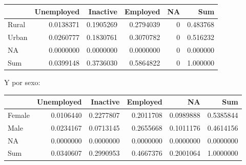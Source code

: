\documentclass[
  spanish,
  12pt,
]{book}
\newenvironment{Shaded}{\begin{snugshade}}{\end{snugshade}}
\newcommand{\AttributeTok}[1]{\textcolor[rgb]{0.13,0.29,0.53}{#1}}
\newcommand{\FunctionTok}[1]{\textcolor[rgb]{0.13,0.29,0.53}{\textbf{#1}}}
\newcommand{\NormalTok}[1]{#1}
\newcommand{\SpecialCharTok}[1]{\textcolor[rgb]{0.81,0.36,0.00}{\textbf{#1}}}
\newcommand{\StringTok}[1]{\textcolor[rgb]{0.31,0.60,0.02}{#1}}
\begin{document}
\begin{tabular}{l|r|r|r|r|r}
\hline
  & Unemployed & Inactive & Employed & NA & Sum\\
\hline
Rural & 0.0138371 & 0.1905269 & 0.2794039 & 0 & 0.483768\\
\hline
Urban & 0.0260777 & 0.1830761 & 0.3070782 & 0 & 0.516232\\
\hline
NA & 0.0000000 & 0.0000000 & 0.0000000 & 0 & 0.000000\\
\hline
Sum & 0.0399148 & 0.3736030 & 0.5864822 & 0 & 1.000000\\
\hline
\end{tabular}

Y por sexo:

\begin{Shaded}
\end{Shaded}

\begin{tabular}{l|r|r|r|r|r}
\hline
  & Unemployed & Inactive & Employed & NA & Sum\\
\hline
Female & 0.0106440 & 0.2277807 & 0.2011708 & 0.0989888 & 0.5385844\\
\hline
Male & 0.0234167 & 0.0713145 & 0.2655668 & 0.1011176 & 0.4614156\\
\hline
NA & 0.0000000 & 0.0000000 & 0.0000000 & 0.0000000 & 0.0000000\\
\hline
Sum & 0.0340607 & 0.2990953 & 0.4667376 & 0.2001064 & 1.0000000\\
\hline
\end{tabular}

\begin{Shaded}
\end{Shaded}
\end{document}
